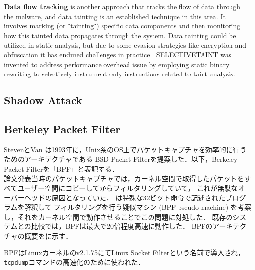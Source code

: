 \textbf{Data flow tracking} is another approach that tracks the flow of data through the malware, and data tainting is an established
technique in this area. It involves marking (or "tainting") specific data components and then monitoring
how this tainted data propagates through the system.
Data tainting could be utilized in static analysis, but due to some evasion strategies like encryption and obfuscation
it has endured challenges in practice \cite{alashjee2019dynamic}.
SELECTIVETAINT \cite{chen2021selectivetaint} was invented to address performance overhead issue by employing static binary
rewriting to selectively instrument only instructions related to taint analysis.


\subsection{Shadow Attack \cite{Weiqin:ShadowAttack}}



\subsection{Berkeley Packet Filter}
StevenとVan \cite{mccanne1993bsd}は1993年に，Unix系のOS上でパケットキャプチャを効率的に行うためのアーキテクチャである
BSD Packet Filterを提案した．以下，Berkeley Packet Filterを「BPF」と表記する． \\
論文発表当時のパケットキャプチャでは，カーネル空間で取得したパケットをすべてユーザー空間にコピーしてからフィルタリングしていて，
これが無駄なオーバーヘッドの原因となっていた．
\cite{mccanne1993bsd}は特殊な32ビット命令で記述されたプログラムを解釈して
フィルタリングを行う疑似マシン (BPF pseudo-machine) を考案し，それをカーネル空間で動作させることでこの問題に対処した．
既存のシステムとの比較では，BPFは最大で20倍程度高速に動作した．
BPFのアーキテクチャの概要をに示す．

BPFはLinuxカーネルのv2.1.75にてLinux Socket Filterという名前で導入され，\texttt{tcpdump}コマンドの高速化のために使われた．

